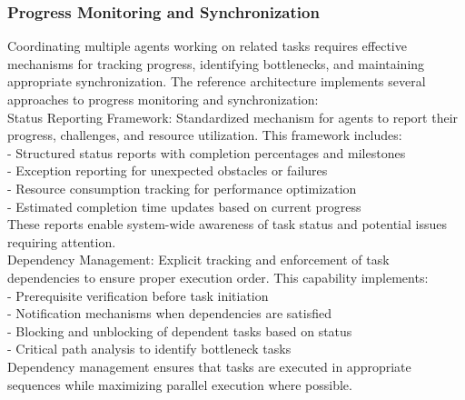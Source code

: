 \subsubsection{Progress Monitoring and Synchronization}
Coordinating multiple agents working on related tasks requires effective mechanisms for tracking progress, identifying bottlenecks, and maintaining appropriate synchronization. The reference architecture implements several approaches to progress monitoring and synchronization:\\ \newline
Status Reporting Framework: Standardized mechanism for agents to report their progress, challenges, and resource utilization. This framework includes:\\ \newline
- Structured status reports with completion percentages and milestones\\ \newline
- Exception reporting for unexpected obstacles or failures\\ \newline
- Resource consumption tracking for performance optimization\\ \newline
- Estimated completion time updates based on current progress\\ \newline
These reports enable system-wide awareness of task status and potential issues requiring attention.\\ \newline
Dependency Management: Explicit tracking and enforcement of task dependencies to ensure proper execution order. This capability implements:\\ \newline
- Prerequisite verification before task initiation\\ \newline
- Notification mechanisms when dependencies are satisfied\\ \newline
- Blocking and unblocking of dependent tasks based on status\\ \newline
- Critical path analysis to identify bottleneck tasks\\ \newline
Dependency management ensures that tasks are executed in appropriate sequences while maximizing parallel execution where possible.\\ \newline

